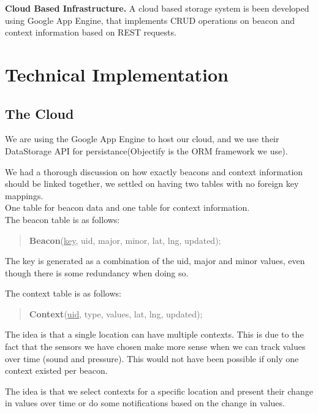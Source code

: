 \documentclass{sigchi}
\begin{document}
\textbf{Cloud Based Infrastructure. }  A cloud based storage system is been developed using Google App Engine, that implements CRUD operations on beacon and context information based on REST requests.

\section{Technical Implementation}
\subsection{The Cloud}
We are using the Google App Engine to host our cloud, and we use their DataStorage API for persistance(Objectify is the ORM framework we use).

We had a thorough discussion on how exactly beacons and context information should be linked together, we settled on having two tables with no foreign key mappings.\\
One table for beacon data and one table for context information.\\

The beacon table is as follows:
\begin{quotation}
\textbf{Beacon}(\underline{key}, uid, major, minor, lat, lng, updated);
\end{quotation}
The key is generated as a combination of the uid, major and minor values, even though there is some redundancy when doing so.

The context table is as follows:
\begin{quotation}
\textbf{Context}(\underline{uid}, type, values, lat, lng, updated);
\end{quotation}
The idea is that a single location can have multiple contexts. This is due to the fact that the sensors we have chosen make more sense when we can track values over time (sound and pressure).
This would not have been possible if only one context existed per beacon.

The idea is that we select contexts for a specific location and present their change in values over time or do some notifications based on the change in values.


\end{document}
